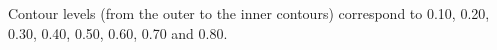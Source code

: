 Contour levels (from the outer to the inner contours) correspond to 0.10, 0.20, 0.30, 0.40, 0.50, 0.60, 0.70 and 0.80.
